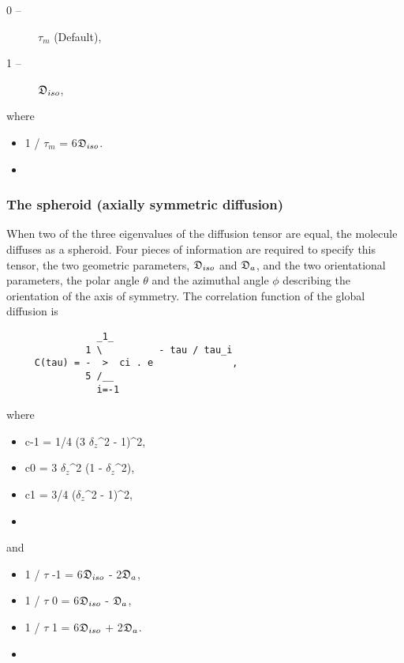  \begin{description} 
 \item[0 --]  $\tau_m$   (Default),  
 \item[1 --]  $\mathfrak{D}_{iso}$,  
 \end{description} 
  

 where 
  

 \begin{itemize} 
 \item[] 1 / $\tau_m$ = 6$\mathfrak{D}_{iso}$.  
 \item[]  
 \end{itemize} 
  

  
 \subsubsection{The spheroid (axially symmetric diffusion)} 

 When two of the three eigenvalues of the diffusion tensor are equal, the molecule diffuses as a spheroid.  Four pieces of information are required to specify this tensor, the two geometric parameters, $\mathfrak{D}_{iso}$ and $\mathfrak{D}_a$, and the two orientational parameters, the polar angle $\theta$ and the azimuthal angle $\phi$ describing the orientation of the axis of symmetry.  The correlation function of the global diffusion is 
  

 {\footnotesize \begin{verbatim} 
                _1_ 
              1 \          - tau / tau_i 
     C(tau) = -  >  ci . e              , 
              5 /__ 
                i=-1 
 \end{verbatim}} 

 where 
  

 \begin{itemize} 
 \item[] c-1 = 1/4 (3 $\delta_z$\^{}2 - 1)\^{}2,  
 \item[] c0  = 3 $\delta_z$\^{}2 (1 - $\delta_z$\^{}2),  
 \item[] c1  = 3/4 ($\delta_z$\^{}2 - 1)\^{}2,  
 \item[]  
 \end{itemize} 
  

 and 
  

 \begin{itemize} 
 \item[] 1 / $\tau$ -1 = 6$\mathfrak{D}_{iso}$ - 2$\mathfrak{D}_a$,  
 \item[] 1 / $\tau$ 0  = 6$\mathfrak{D}_{iso}$ - $\mathfrak{D}_a$,  
 \item[] 1 / $\tau$ 1  = 6$\mathfrak{D}_{iso}$ + 2$\mathfrak{D}_a$.  
 \item[]  
 \end{itemize} 
  

